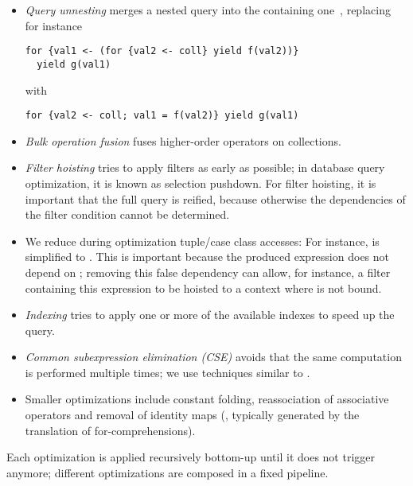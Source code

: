 \begin{itemize}
\item \emph{Query unnesting} merges a nested query into the containing
one~\citep{Fegaras00,Grust99How}, replacing for instance
\begin{lstlisting}
for {val1 <- (for {val2 <- coll} yield f(val2))}
  yield g(val1)
\end{lstlisting}
with
\begin{lstlisting}
for {val2 <- coll; val1 = f(val2)} yield g(val1)
\end{lstlisting}
\item \emph{Bulk operation fusion} fuses higher-order operators on collections.
\item \emph{Filter hoisting} tries to apply filters as early as possible; in
database query optimization, it is known as selection pushdown. For filter hoisting, it
is important that the full query is reified, because otherwise the dependencies of the filter condition
cannot be determined.
\item
We reduce during optimization
tuple/case class accesses: For instance,
 is simplified to . This is important because
the produced expression does not depend on ; removing this false
dependency can allow, for instance, a filter containing this expression to be
hoisted to a context where  is not bound.
\item \emph{Indexing} tries to apply one or more of the available indexes to speed up the query.
\item \emph{Common subexpression elimination (CSE)} avoids that the same computation
is performed multiple times; we use techniques similar to
\citet{rompf2010lightweight}.
\item Smaller optimizations include constant folding, reassociation of
associative operators and
      removal of identity maps (, typically generated by
      the translation of for-comprehensions).
\end{itemize}
Each optimization is applied recursively bottom-up until it does not trigger
anymore; different optimizations are composed in a fixed pipeline.

